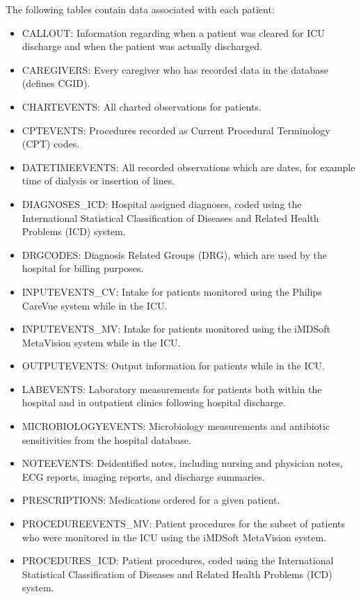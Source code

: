\documentclass[english]{article}
\begin{document}
The following tables contain data associated with each patient:

\begin{itemize}
  \item CALLOUT: Information regarding when a patient was cleared for ICU discharge and when the patient was actually discharged.
  \item CAREGIVERS: Every caregiver who has recorded data in the database (defines CGID).
  \item CHARTEVENTS: All charted observations for patients.
  \item CPTEVENTS: Procedures recorded as Current Procedural Terminology (CPT) codes.
  \item DATETIMEEVENTS: All recorded observations which are dates, for example time of dialysis or insertion of lines.
  \item DIAGNOSES\_ICD: Hospital assigned diagnoses, coded using the International Statistical Classification of Diseases and Related Health Problems (ICD) system.
  \item DRGCODES: Diagnosis Related Groups (DRG), which are used by the hospital for billing purposes.
  \item INPUTEVENTS\_CV: Intake for patients monitored using the Philips CareVue system while in the ICU.
  \item INPUTEVENTS\_MV: Intake for patients monitored using the iMDSoft MetaVision system while in the ICU.
  \item OUTPUTEVENTS: Output information for patients while in the ICU.
  \item LABEVENTS: Laboratory measurements for patients both within the hospital and in outpatient clinics following hospital discharge.
  \item MICROBIOLOGYEVENTS: Microbiology measurements and antibiotic sensitivities from the hospital database.
  \item NOTEEVENTS: Deidentified notes, including nursing and physician notes, ECG reports, imaging reports, and discharge summaries.
  \item PRESCRIPTIONS: Medications ordered for a given patient.
  \item PROCEDUREEVENTS\_MV: Patient procedures for the subset of patients who were monitored in the ICU using the iMDSoft MetaVision system.
  \item PROCEDURES\_ICD: Patient procedures, coded using the International Statistical Classification of Diseases and Related Health Problems (ICD) system.
\end{itemize}
\end{document}

